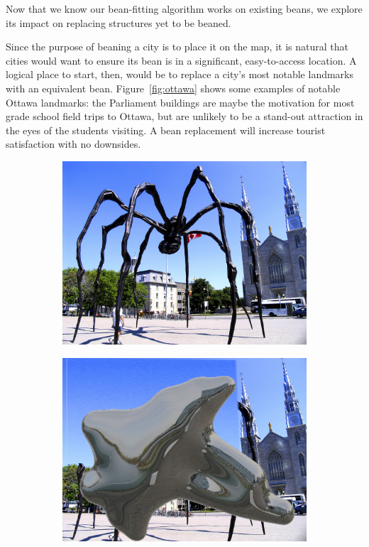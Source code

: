 \documentclass[%
reprint,
twocolumn,
nofootinbib,
 amsmath,amssymb,
 aps,
]{revtex4-2}
\begin{document}
Now that we know our bean-fitting algorithm works on existing beans, we explore its impact on replacing structures yet to be beaned.

Since the purpose of beaning a city is to place it on the map, it is natural that cities would want to ensure its bean is in a significant, easy-to-access location. A logical place to start, then, would be to replace a city's most notable landmarks with an equivalent bean. Figure~\ref{fig:ottawa} shows some examples of notable Ottawa landmarks: the Parliament buildings are maybe the motivation for most grade school field trips to Ottawa, but are unlikely to be a stand-out attraction in the eyes of the students visiting. A bean replacement will increase tourist satisfaction with no downsides.

\begin{figure}[H]
    \begin{subfigure}{0.23\textwidth}
        \includegraphics[width=0.98\linewidth]{img/maman.jpg}
    \end{subfigure}
    \begin{subfigure}{0.23\textwidth}
        \includegraphics[width=0.98\linewidth]{img/maman-bean.jpg}

\end{subfigure}
\end{figure}
\end{document}
